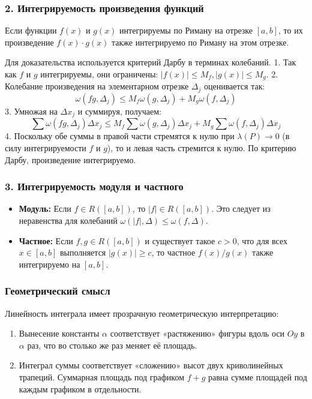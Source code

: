 \subsubsection*{2. Интегрируемость произведения функций}

\begin{theorem}
Если функции $f(x)$ и $g(x)$ интегрируемы по Риману на отрезке $[a, b]$, то их произведение $f(x) \cdot g(x)$ также интегрируемо по Риману на этом отрезке.
\end{theorem}

\begin{tcolorbox}[title=Доказательство (схема), breakable]
Для доказательства используется критерий Дарбу в терминах колебаний.
1. Так как $f$ и $g$ интегрируемы, они ограничены: $|f(x)| \le M_f, |g(x)| \le M_g$.
2. Колебание произведения на элементарном отрезке $\Delta_j$ оценивается так:
\[ \omega(fg, \Delta_j) \le M_f \omega(g, \Delta_j) + M_g \omega(f, \Delta_j) \]
3. Умножая на $\Delta x_j$ и суммируя, получаем:
\[ \sum \omega(fg, \Delta_j) \Delta x_j \le M_f \sum \omega(g, \Delta_j) \Delta x_j + M_g \sum \omega(f, \Delta_j) \Delta x_j \]
4. Поскольку обе суммы в правой части стремятся к нулю при $\lambda(P) \to 0$ (в силу интегрируемости $f$ и $g$), то и левая часть стремится к нулю. По критерию Дарбу, произведение интегрируемо.
\end{tcolorbox}

\subsubsection*{3. Интегрируемость модуля и частного}

\begin{itemize}
    \item \textbf{Модуль:} Если $f \in R([a, b])$, то $|f| \in R([a, b])$. Это следует из неравенства для колебаний $\omega(|f|, \Delta) \le \omega(f, \Delta)$.
    \item \textbf{Частное:} Если $f, g \in R([a, b])$ и существует такое $c > 0$, что для всех $x \in [a, b]$ выполняется $|g(x)| \ge c$, то частное $f(x)/g(x)$ также интегрируемо на $[a, b]$.
\end{itemize}

\subsubsection*{Геометрический смысл}
Линейность интеграла имеет прозрачную геометрическую интерпретацию:
\begin{enumerate}
    \item Вынесение константы $\alpha$ соответствует «растяжению» фигуры вдоль оси $Oy$ в $\alpha$ раз, что во столько же раз меняет её площадь.
    \item Интеграл суммы соответствует «сложению» высот двух криволинейных трапеций. Суммарная площадь под графиком $f+g$ равна сумме площадей под каждым графиком в отдельности.
\end{enumerate}

